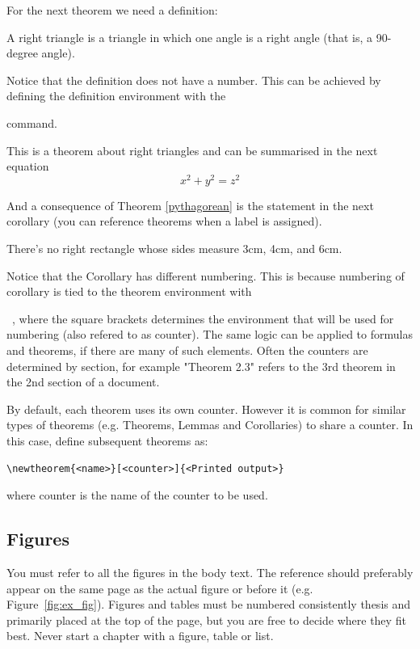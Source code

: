 For the next theorem we need a definition:

\begin{definition}
A right triangle is a triangle in which one angle is a right angle (that is, a 90-degree angle).
\end{definition}

Notice that the definition does not have a number. This can be achieved by defining the definition environment with the \string\newtheorem*{}\ command.

\begin{theorem}
\label{pythagorean}
This is a theorem about right triangles and can be summarised in the next 
equation 
\[ x^2 + y^2 = z^2 \]
\end{theorem}

And a consequence of Theorem \ref{pythagorean} is the statement in the next 
corollary (you can reference theorems when a label is assigned).

\begin{corollary}
There's no right rectangle whose sides measure 3cm, 4cm, and 6cm.
\end{corollary}

Notice that the Corollary has different numbering. This is because numbering of corollary is tied to the theorem environment with \string\newtheorem{corollary}{Corollary}[theorem]\ , where the square brackets determines the environment that will be used for numbering (also refered to as counter). The same logic can be applied to formulas and theorems, if there are many of such elements. Often the counters are determined by section, for example "Theorem 2.3" refers to the 3rd theorem in the 2nd section of a document. 

By default, each theorem uses its own counter. However it is common for similar types of theorems (e.g. Theorems, Lemmas and Corollaries) to share a counter. In this case, define subsequent theorems as:
\begin{verbatim}
\newtheorem{<name>}[<counter>]{<Printed output>}
\end{verbatim}
where counter is the name of the counter to be used.


\subsection{Figures}

You must refer to all the figures in the body text. The reference
should preferably appear on the same page as the actual figure or
before it (e.g. Figure~\ref{fig:ex_fig}). Figures and tables must be numbered consistently thesis
and primarily placed at the top of the page, but you are free to
decide where they fit best. Never start a chapter with a figure, table
or list.

